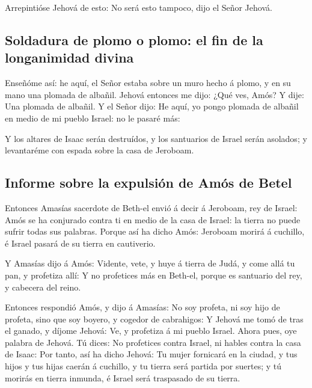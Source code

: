  Arrepintióse Jehová de esto: No será esto tampoco, dijo
el Señor Jehová.

\hypertarget{soldadura-de-plomo-o-plomo-el-fin-de-la-longanimidad-divina}{%
\subsection{Soldadura de plomo o plomo: el fin de la longanimidad
divina}\label{soldadura-de-plomo-o-plomo-el-fin-de-la-longanimidad-divina}}

 Enseñóme así: he aquí, el Señor estaba sobre un muro
hecho á plomo, y en su mano una plomada de albañil. 
Jehová entonces me dijo: ¿Qué ves, Amós? Y dije: Una plomada de albañil.
Y el Señor dijo: He aquí, yo pongo plomada de albañil en medio de mi
pueblo Israel: no le pasaré más:

 Y los altares de Isaac serán destruídos, y los santuarios
de Israel serán asolados; y levantaréme con espada sobre la casa de
Jeroboam.

\hypertarget{informe-sobre-la-expulsiuxf3n-de-amuxf3s-de-betel}{%
\subsection{Informe sobre la expulsión de Amós de
Betel}\label{informe-sobre-la-expulsiuxf3n-de-amuxf3s-de-betel}}

 Entonces Amasías sacerdote de Beth-el envió á decir á
Jeroboam, rey de Israel: Amós se ha conjurado contra ti en medio de la
casa de Israel: la tierra no puede sufrir todas sus palabras.
 Porque así ha dicho Amós: Jeroboam morirá á cuchillo, é
Israel pasará de su tierra en cautiverio.

 Y Amasías dijo á Amós: Vidente, vete, y huye á tierra de
Judá, y come allá tu pan, y profetiza allí:  Y no
profetices más en Beth-el, porque es santuario del rey, y cabecera del
reino.

 Entonces respondió Amós, y dijo á Amasías: No soy
profeta, ni soy hijo de profeta, sino que soy boyero, y cogedor de
cabrahigos:  Y Jehová me tomó de tras el ganado, y díjome
Jehová: Ve, y profetiza á mi pueblo Israel.  Ahora pues,
oye palabra de Jehová. Tú dices: No profetices contra Israel, ni hables
contra la casa de Isaac:  Por tanto, así ha dicho Jehová:
Tu mujer fornicará en la ciudad, y tus hijos y tus hijas caerán á
cuchillo, y tu tierra será partida por suertes; y tú morirás en tierra
inmunda, é Israel será traspasado de su tierra.

